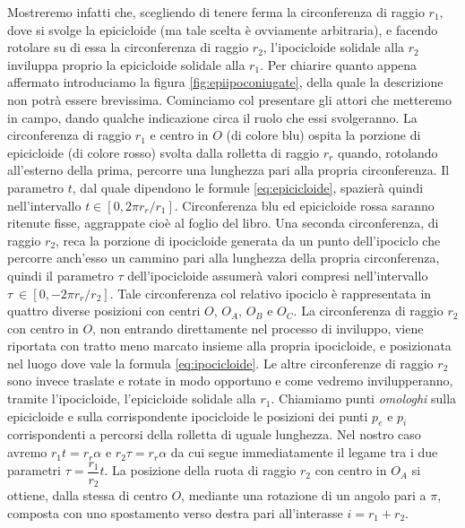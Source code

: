 Mostreremo infatti che, scegliendo di tenere ferma
la circonferenza di raggio $r_1$, dove si svolge la epicicloide
(ma tale scelta \`e ovviamente arbitraria), e facendo rotolare 
su di essa la circonferenza di raggio $r_2$, l'ipocicloide solidale 
alla $r_2$ inviluppa proprio la epicicloide solidale alla $r_1$.
Per chiarire quanto appena affermato introduciamo la figura
\ref{fig:epiipoconiugate}, della quale la descrizione non potr\`a essere
brevissima.
Cominciamo col presentare gli attori che metteremo in campo,
dando qualche indicazione circa il ruolo che essi svolgeranno.
La circonferenza di raggio $r_1$ e centro in $O$ (di colore blu) ospita la porzione di
epicicloide (di colore rosso) svolta dalla rolletta di raggio $r_r$ quando,
rotolando all'esterno della prima, percorre una lunghezza pari alla
propria circonferenza.
Il parametro $t$, dal quale dipendono le formule
\ref{eq:epicicloide}, spazier\`a quindi nell'intervallo
 $t \in[0, 2\pi r_r/r_1]$. Circonferenza blu ed epicicloide rossa saranno
ritenute fisse, aggrappate cio\`e al foglio del libro.
\noindent Una seconda circonferenza, di raggio $r_2$, reca
la porzione di ipocicloide generata da un punto dell'ipociclo
che percorre anch'esso un cammino pari alla lunghezza della propria circonferenza, quindi
il parametro $\tau$ dell'ipocicloide
assumer\`a valori compresi nell'intervallo $\tau\ \in [0, -2\pi r_r/r_2]$.
Tale circonferenza col relativo ipociclo \`e rappresentata in quattro
diverse posizioni
con centri $O$, $O_{\scriptscriptstyle A}$, $O_{\scriptscriptstyle B}$ e $O_{\scriptscriptstyle C}$.
La circonferenza di raggio $r_2$ con centro in ${O}$,
non entrando direttamente nel processo di inviluppo, viene
riportata con tratto meno marcato
insieme alla propria ipocicloide, e posizionata
nel luogo dove vale la formula \ref{eq:ipocicloide}.
Le altre circonferenze di raggio $r_2$ sono invece traslate e rotate
in modo opportuno e come vedremo invilupperanno, tramite l'ipocicloide,
l'epicicloide solidale alla $r_1$.
\noindent Chiamiamo punti
{\em omologhi} sulla epicicloide e sulla corrispondente
ipocicloide le posizioni dei punti $p_e$ e $p_i$ corrispondenti a percorsi 
della rolletta di uguale lunghezza.
Nel nostro caso avremo $r_1 t = r_r\alpha$
e $r_2 \tau= r_r\alpha$ da cui segue immediatamente il legame
tra i due parametri $\tau = \dfrac{r_1}{r_2}t$.
\noindent La posizione della ruota di raggio $r_2$ con centro in
$O_{\scriptscriptstyle A}$ si ottiene, dalla stessa di centro $O$, mediante una
rotazione di un angolo pari a $\pi$, composta con uno spostamento verso
destra pari all'interasse $i=r_1+r_2$.
